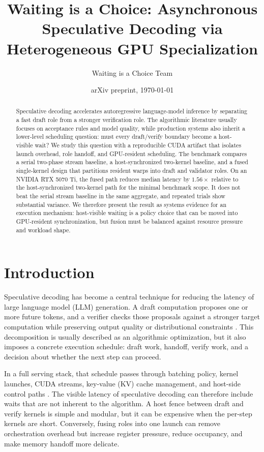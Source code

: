 \documentclass[11pt]{article}
\title{Waiting is a Choice: Asynchronous Speculative Decoding via Heterogeneous GPU Specialization}
\author{Waiting is a Choice Team}
\date{arXiv preprint, \today}
\begin{document}
\maketitle

\begin{abstract}
Speculative decoding accelerates autoregressive language-model inference by separating a fast draft role from a stronger verification role. The algorithmic literature usually focuses on acceptance rules and model quality, while production systems also inherit a lower-level scheduling question: must every draft/verify boundary become a host-visible wait? We study this question with a reproducible CUDA artifact that isolates launch overhead, role handoff, and GPU-resident scheduling. The benchmark compares a serial two-phase stream baseline, a host-synchronized two-kernel baseline, and a fused single-kernel design that partitions resident warps into draft and validator roles. On an NVIDIA RTX 5070 Ti, the fused path reduces median latency by \(1.56\times\) relative to the host-synchronized two-kernel path for the minimal benchmark scope. It does not beat the serial stream baseline in the same aggregate, and repeated trials show substantial variance. We therefore present the result as systems evidence for an execution mechanism: host-visible waiting is a policy choice that can be moved into GPU-resident synchronization, but fusion must be balanced against resource pressure and workload shape.
\end{abstract}

\section{Introduction}
Speculative decoding has become a central technique for reducing the latency of large language model (LLM) generation. A draft computation proposes one or more future tokens, and a verifier checks those proposals against a stronger target computation while preserving output quality or distributional constraints \cite{leviathan2023speculative,chen2023accelerating,cai2024medusa}. This decomposition is usually described as an algorithmic optimization, but it also imposes a concrete execution schedule: draft work, handoff, verify work, and a decision about whether the next step can proceed.

In a full serving stack, that schedule passes through batching policy, kernel launches, CUDA streams, key-value (KV) cache management, and host-side control paths \cite{kwon2023pagedattention,yu2022orca,nvidiaTensorRTLLM,nvidiaFasterTransformer}. The visible latency of speculative decoding can therefore include waits that are not inherent to the algorithm. A host fence between draft and verify kernels is simple and modular, but it can be expensive when the per-step kernels are short. Conversely, fusing roles into one launch can remove orchestration overhead but increase register pressure, reduce occupancy, and make memory handoff more delicate.
\end{document}
